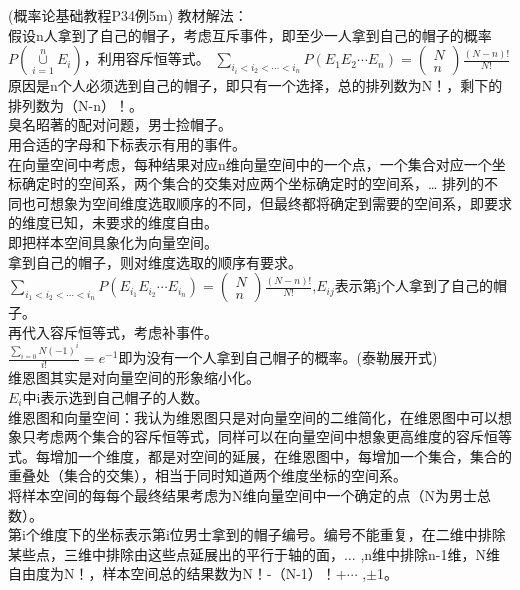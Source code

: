 \documentclass{book}%
\begin{document}
    (概率论基础教程P34例5m)
    教材解法：\\
    假设n人拿到了自己的帽子，考虑互斥事件，即至少一人拿到自己的帽子的概率$P(\mathop \cup \limits_{i=1}^{n}E_{i})$，利用容斥恒等式。
    $\sum\limits_{i_{i}<i_{2}<\cdots <i_{n}}P(E_{1}E_{2}\cdots E_{n})=\begin{pmatrix}
    	N\\n
    \end{pmatrix}\frac{(N-n)!}{N!}$\\
    原因是n个人必须选到自己的帽子，即只有一个选择，总的排列数为N！，剩下的排列数为（N-n）！。\\
    臭名昭著的配对问题，男士捡帽子。\\
    用合适的字母和下标表示有用的事件。\\
    在向量空间中考虑，每种结果对应n维向量空间中的一个点，一个集合对应一个坐标确定时的空间系，两个集合的交集对应两个坐标确定时的空间系，\dots
    排列的不同也可想象为空间维度选取顺序的不同，但最终都将确定到需要的空间系，即要求的维度已知，未要求的维度自由。\\
    即把样本空间具象化为向量空间。\\
    拿到自己的帽子，则对维度选取的顺序有要求。\\
    $\sum\limits_{i_{1}<i_{2}<\cdots <i_{n}}P(E_{i_{1}}E_{i_{2}}\cdots E_{i_{n}})=\begin{pmatrix}
    	N\\n
    \end{pmatrix}\frac{(N-n)!}{N!}$,$E_{i{j}}$表示第j个人拿到了自己的帽子。\\
    再代入容斥恒等式，考虑补事件。\\
    $\frac{\sum\limits_{i=0}{N}(-1)^{i}}{i!}=e^{-1}$即为没有一个人拿到自己帽子的概率。(泰勒展开式)\\
    维恩图其实是对向量空间的形象缩小化。\\
    $E_{i}$中i表示选到自己帽子的人数。\\
    维恩图和向量空间：我认为维恩图只是对向量空间的二维简化，在维恩图中可以想象只考虑两个集合的容斥恒等式，同样可以在向量空间中想象更高维度的容斥恒等式。每增加一个维度，都是对空间的延展，在维恩图中，每增加一个集合，集合的重叠处（集合的交集），相当于同时知道两个维度坐标的空间系。\\
    将样本空间的每每个最终结果考虑为N维向量空间中一个确定的点（N为男士总数）。\\
    第i个维度下的坐标表示第i位男士拿到的帽子编号。编号不能重复，在二维中排除某些点，三维中排除由这些点延展出的平行于轴的面，$\dots$ ,n维中排除n-1维，N维自由度为N！，样本空间总的结果数为N！-（N-1）！+$\cdots$ ,$\pm$1。\\
\end{document}
